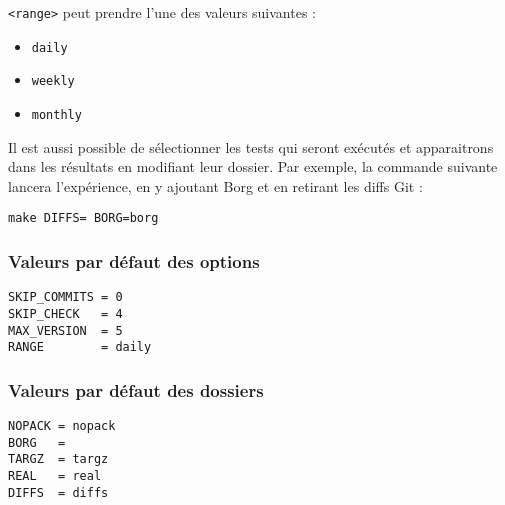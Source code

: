 \documentclass[a4paper]{report}
\begin{document}
\verb|<range>| peut prendre l'une des valeurs suivantes :

\begin{itemize}
  \item \verb|daily|
  \item \verb|weekly|
  \item \verb|monthly|
\end{itemize}

Il est aussi possible de sélectionner les tests qui seront exécutés
et apparaitrons dans les résultats en modifiant leur dossier.
Par exemple, la commande suivante lancera l'expérience, en y ajoutant Borg et en retirant les diffs Git :

\begin{lstlisting}[language=Make]
make DIFFS= BORG=borg
\end{lstlisting}

\subsubsection{Valeurs par défaut des options}

\begin{lstlisting}[language=Make]
SKIP_COMMITS = 0
SKIP_CHECK   = 4
MAX_VERSION  = 5
RANGE        = daily
\end{lstlisting}

\subsubsection{Valeurs par défaut des dossiers}

\begin{lstlisting}[language=Make]
NOPACK = nopack
BORG   =
TARGZ  = targz
REAL   = real
DIFFS  = diffs
\end{lstlisting}
\end{document}
